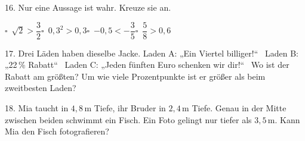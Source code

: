 \documentclass[11pt]{article}
\begin{document}
\begin{pfaufg}{}{16.}{}
Nur eine Aussage ist wahr. Kreuze sie an.\par\medskip\noindent\hspace*{7mm}\mbox{$\square$\ $\sqrt{2} > \dfrac{3}{2}$}\hspace{10mm}\mbox{$\square$\ $0{,}3^2 > 0{,}3$}\hspace{10mm}\mbox{$\square$\ $-0{,}5 < -\dfrac{3}{5}$}\hspace{10mm}\mbox{$\square$\ $\dfrac{5}{8} > 0{,}6$}\rule[-3mm]{0pt}{8mm}\par\smallskip 
{}
\end{pfaufg}

\begin{pfaufg}{}{17.}{}
Drei Läden haben dieselbe Jacke. Laden A: „Ein Viertel billiger!“ \ Laden B: „22\,\% Rabatt“ \ Laden C: „Jeden fünften Euro schenken wir dir!“ \ Wo ist der Rabatt am größten? Um wie viele Prozentpunkte ist er größer als beim zweitbesten Laden?
\end{pfaufg}

\begin{pfaufg}{}{18.}{}
Mia taucht in $4{,}8$\,m Tiefe, ihr Bruder in $2{,}4$\,m Tiefe. Genau in der Mitte zwischen beiden schwimmt ein Fisch. Ein Foto gelingt nur tiefer als $3{,}5$\,m. Kann Mia den Fisch fotografieren?
\end{pfaufg}

\par\vfill{}
\end{document}
